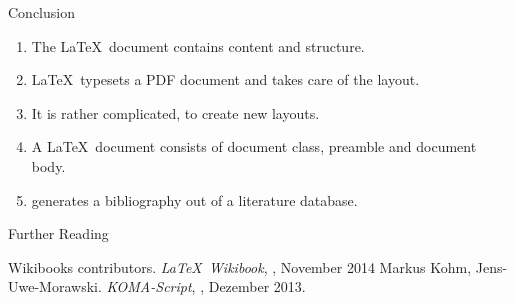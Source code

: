 
\begin{frame}[label=basics-summary]{Conclusion}
  \begin{enumerate}
    \item The \alert{\LaTeX\ document} contains \alert{content and structure}.
    \item \LaTeX\ typesets a \alert{PDF document} and takes care of the \alert{layout}.
    \item It is rather complicated, to create \alert{new layouts}.
    \item A \LaTeX\ document consists of \alert{document class}, \alert{preamble} and \alert{document body}.
    \item \alert{\BibTeX} generates a \alert{bibliography} out of a \alert{literature database}.
  \end{enumerate}
\end{frame}

\begin{frame}[fragile]{Further Reading}
  \begin{mybib}
      Wikibooks contributors.
      \newblock \emph{\LaTeX\ Wikibook},
      \newblock {}, November 2014
      Markus Kohm, Jens-Uwe-Morawski.
      \newblock \emph{KOMA-Script},
      \newblock {}, Dezember 2013.
  \end{mybib}
\end{frame}


